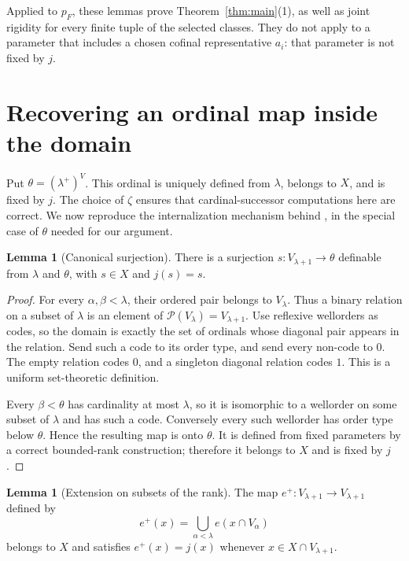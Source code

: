 \documentclass[11pt,letterpaper]{article}
\theoremstyle{definition}
\newtheorem{lemma}[definition]{Lemma}
\numberwithin{equation}{section}
\newcommand{\Pow}{\mathcal P}
\begin{document}
Applied to $p_F$, these lemmas prove Theorem~\ref{thm:main}(1), as well as joint rigidity for every finite tuple of the selected classes. They do not apply to a parameter that includes a chosen cofinal representative $a_i$: that parameter is not fixed by $j$.

\section{Recovering an ordinal map inside the domain}\label{sec:ordinalmap}

Put $\theta=(\lambda^+)^V$. This ordinal is uniquely defined from $\lambda$, belongs to $X$, and is fixed by $j$. The choice of $\zeta$ ensures that cardinal-successor computations here are correct. We now reproduce the internalization mechanism behind \cite[Lemmas~3.7--3.9]{abl}, in the special case of $\theta$ needed for our argument.

\begin{lemma}[Canonical surjection]\label{lem:surj}
There is a surjection $s:V_{\lambda+1}\to\theta$ definable from $\lambda$ and $\theta$, with $s\in X$ and $j(s)=s$.
\end{lemma}

\begin{proof}
For every $\alpha,\beta<\lambda$, their ordered pair belongs to $V_\lambda$. Thus a binary relation on a subset of $\lambda$ is an element of $\Pow(V_\lambda)=V_{\lambda+1}$. Use reflexive wellorders as codes, so the domain is exactly the set of ordinals whose diagonal pair appears in the relation. Send such a code to its order type, and send every non-code to $0$. The empty relation codes $0$, and a singleton diagonal relation codes $1$. This is a uniform set-theoretic definition.

Every $\beta<\theta$ has cardinality at most $\lambda$, so it is isomorphic to a wellorder on some subset of $\lambda$ and has such a code. Conversely every such wellorder has order type below $\theta$. Hence the resulting map is onto $\theta$. It is defined from fixed parameters by a correct bounded-rank construction; therefore it belongs to $X$ and is fixed by $j$.
\end{proof}

\begin{lemma}[Extension on subsets of the rank]\label{lem:eplus}
The map $e^+:V_{\lambda+1}\to V_{\lambda+1}$ defined by
\begin{equation}\label{eq:eplus}
e^+(x)=\bigcup_{\alpha<\lambda}e(x\cap V_\alpha)
\end{equation}
belongs to $X$ and satisfies $e^+(x)=j(x)$ whenever $x\in X\cap V_{\lambda+1}$.
\end{lemma}
\end{document}
